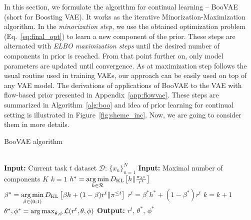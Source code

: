 In this section, we formulate the algorithm for continual learning -- BooVAE (short for Boosting VAE).  
It works as the iterative Minorization-Maximization algorithm. 
In the \textit{minorization step}, we use the obtained optimization problem (Eq.~\ref{eq:final_opt}) to learn a new component of the prior.
These steps are alternated with \textit{ELBO maximization steps} until the desired number of components in prior is reached. From that point further on, only model parameters are updated until convergence. As at maximization step follows the usual routine used in training VAEs, our approach can be easily used on top of any VAE model. The derivations of applications of BooVAE to the VAE with flow-based prior presented in Appendix~\ref{app:flowvae}. These steps are summarized in Algorithm~\ref{alg:boo} and idea of prior learning for continual setting is illustrated in Figure~\ref{fig:sheme_inc}. Now, we are going to consider them in more details.
\begin{algorithm}
	\caption{BooVAE algorithm}
	\label{alg:boo}
	\begin{algorithmic}
  \\\hrulefill
\State \hskip-3mm  {\bfseries Input:} { Current task $t$ dataset $\mathcal{D}: \,\{x_n\}_{n=1}^N$}
\State \hskip-3mm {\bfseries Input:} { Maximal number of components $K$}
		\State $k = 1$
		\State $h^* = \operatorname*{arg\,min}\limits_{h\in\mathcal{R}}D_{\mathrm{KL}}\left[h\| \frac{ \pi_{\lambda^*}}{r^{t}}\right]$
		\State $\beta^* = \operatorname*{arg\,min}\limits_{\beta\in(0;1)}D_{\mathrm{KL}}\left[\beta h + (1 - \beta) r^{t}\|\pi^{\leq t}\right]$
		\State $r^{t} = \beta^* h^* + (1 - \beta^*) r^{t} $
		\State $k = k + 1$
				\State $\theta^*, \phi^*  = \operatorname*{arg\,max}_{\theta,\phi} \mathcal{L}(r^{t}, \theta, \phi) $
		\EndWhile
            \State \hskip-3mm  {\bfseries Output:} $r^{t}$, $\theta^*$, $\phi^*$
	\end{algorithmic}
\end{algorithm}
